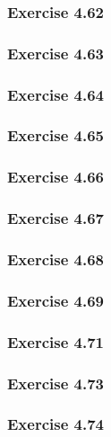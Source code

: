\subsubsection{Exercise 4.62}


\subsubsection{Exercise 4.63}


\subsubsection{Exercise 4.64}


\subsubsection{Exercise 4.65}


\subsubsection{Exercise 4.66}


\subsubsection{Exercise 4.67}


\subsubsection{Exercise 4.68}


\subsubsection{Exercise 4.69}


\subsubsection{Exercise 4.71}


\subsubsection{Exercise 4.73}


\subsubsection{Exercise 4.74}

